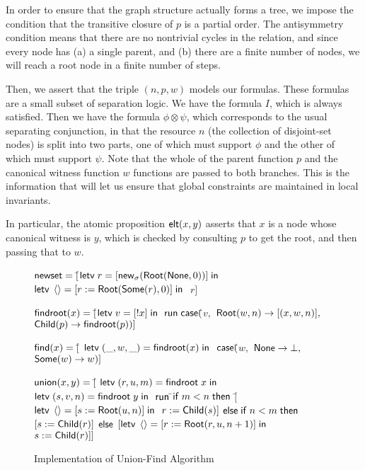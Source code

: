 In order to ensure that the graph structure actually forms a tree, we
impose the condition that the transitive closure of $p$ is a partial
order. The antisymmetry condition means that there are no nontrivial
cycles in the relation, and since every node has (a) a single parent,
and (b) there are a finite number of nodes, we will reach a root node
in a finite number of steps.

Then, we assert that the triple $(n, p, w)$ models our formulas.
These formulas are a small subset of separation logic. We have the
formula $I$, which is always satisfied. Then we have the formula $\phi
\otimes \psi$, which corresponds to the usual separating conjunction,
in that the resource $n$ (the collection of disjoint-set nodes) is
split into two parts, one of which must support $\phi$ and the other
of which must support $\psi$. Note that the whole of the parent
function $p$ and the canonical witness function $w$ functions are
passed to both branches. This is the information that will let us
ensure that global constraints are maintained in local invariants.

In particular, the atomic proposition $\mathsf{elt}({x}, {y})$ asserts that $x$ is
a node whose canonical witness is $y$, which is checked by consulting
$p$ to get the root, and then passing that to $w$.

\begin{figure}
\mbox{}
\begin{specification}
\nextline $\mathsf{newset} = [$\=$\mathsf{letv}\;r = [\mathsf{new}_{\sigma}(\mathsf{Root}(\mathsf{None}, 0))]\;\mathsf{in}\;$
\nextline              \>$\mathsf{letv}\;\left<\right> = [r := \mathsf{Root}(\mathsf{Some}(r), 0)]\;\mathsf{in}\;$
\nextline              \>$r]$

\nextline[1em] $\mathsf{findroot}(x) = [$\=$
                  \mathsf{letv}\;v = [!x]\;\mathsf{in}\;$ 
\nextline \>     $\mathsf{run}\;{}\mathsf{case}($\=$v,$ 
\nextline \> \>     $\mathsf{Root}(w, n) \to [(x, w, n)],$
\nextline \> \>     $\mathsf{Child}(p) \to \mathsf{findroot}(p))]$

\nextline[1em] $\mathsf{find}(x) = [$\=
             $\mathsf{letv}\;(\_, w, \_) = \mathsf{findroot}(x)\;\mathsf{in}\;$ 
\nextline \> $\mathsf{case}($\=$w,$ 
\nextline \> \> $\mathsf{None} \to \bot,$  
\nextline \> \> $\mathsf{Some}(w) \to w)]$

\nextline[1em] $\mathsf{union}(x, y) = [$\= 
                 $\mathsf{letv}\;(r, u, m) = \mathsf{findroot}\;x\;\mathsf{in}\;$ 
\nextline \>     $\mathsf{letv}\;(s, v, n) = \mathsf{findroot}\;y\;\mathsf{in}\;$ 
\nextline \>     $\mathsf{run}\;{}$\=$\mathsf{if}\;m < n\;\mathsf{then}$ 
\nextline \> \>   \;\;$[$\=$\mathsf{letv}\;\left<\right> = [s := \mathsf{Root}(u, n)]\;\mathsf{in}\;$ 
\nextline \> \>         \>$r := \mathsf{Child}(s)]$ 
\nextline \> \> $\mathsf{else}\;\mathsf{if}\;n < m\;\mathsf{then}$ 
\nextline \> \>   \;\;$[s := \mathsf{Child}(r)]$
\nextline \> \> $\mathsf{else}$ 
\nextline \> \>   \;\;$[\mathsf{letv}\;\left<\right> = [r := \mathsf{Root}(r, u, n+1)]\;\mathsf{in}\;$
\nextline \> \>      \>$s := \mathsf{Child}(r)]]$
\end{specification}
\caption{Implementation of Union-Find Algorithm}
\label{union-find:impl}  
\end{figure}

